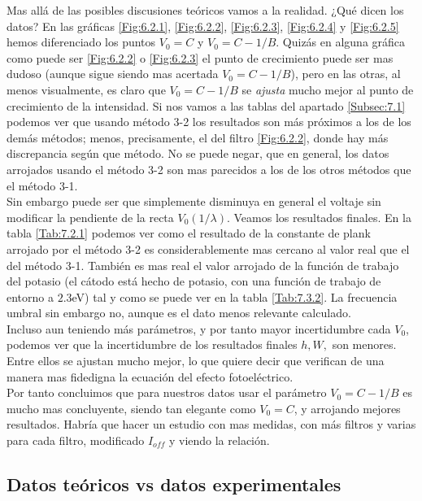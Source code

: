 \documentclass[12pt,a4paper]{article}
\numberwithin{equation}{section}
\numberwithin{table}{section}
\numberwithin{figure}{section}
\begin{document}
Mas allá de las posibles discusiones teóricos vamos a la realidad. ¿Qué dicen los datos? En las gráficas \ref{Fig:6.2.1}, \ref{Fig:6.2.2}, \ref{Fig:6.2.3}, \ref{Fig:6.2.4} y \ref{Fig:6.2.5} hemos diferenciado los puntos $V_0=C$ y $V_0=C-1/B$. Quizás en alguna gráfica como puede ser \ref{Fig:6.2.2} o \ref{Fig:6.2.3} el punto de crecimiento puede ser mas dudoso (aunque sigue siendo mas acertada $V_0=C-1/B$), pero en las otras, al menos visualmente, es claro que $V_0 =C-1/B$ se \textit{ajusta} mucho mejor al punto de crecimiento de la intensidad. Si nos vamos a las tablas del apartado \ref{Subsec:7.1} podemos ver que usando método 3-2 los resultados son más próximos a los de los demás métodos; menos, precisamente, el del filtro \ref{Fig:6.2.2}, donde hay más discrepancia según que método. No se puede negar, que en general, los datos arrojados usando el método 3-2 son mas parecidos a los de los otros métodos que el método 3-1.\\

Sin embargo puede ser que simplemente disminuya en general el voltaje sin modificar la pendiente de la recta $V_0 (1/\lambda)$. Veamos los resultados finales. En la tabla \ref{Tab:7.2.1} podemos ver como el resultado de la constante de plank arrojado por el método 3-2 es considerablemente mas cercano al valor real que el del método 3-1. También es mas real el valor arrojado de la función de trabajo del potasio (el cátodo está hecho de potasio, con una función de trabajo de entorno a $2.3$eV) tal y como se puede ver en la tabla \ref{Tab:7.3.2}. La frecuencia umbral sin embargo no, aunque es el dato menos relevante calculado. \\

Incluso aun teniendo más parámetros, y por tanto mayor incertidumbre cada $V_0$, podemos ver que la incertidumbre de los resultados finales $h,W,$ son menores. Entre ellos se ajustan mucho mejor, lo que quiere decir que verifican de una manera mas fidedigna la ecuación del efecto fotoeléctrico. \\

Por tanto concluimos que para nuestros datos usar el parámetro $V_0 = C-1/B$ es mucho mas concluyente, siendo tan elegante como $V_0 = C$, y arrojando mejores resultados. Habría que hacer un estudio con mas medidas, con más filtros y varias para cada filtro, modificado $I_{off}$ y viendo la relación. 

\subsection{Datos teóricos vs datos experimentales}
\end{document}
